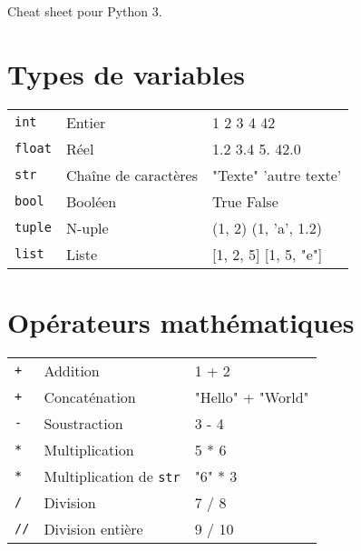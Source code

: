 \documentclass[10pt,a4paper,landscape]{article}
\newcommand*\keystroke[1]{%
  \tikz[baseline=(key.base)]
    \node[%
      draw,
      fill=white,
      drop shadow={shadow xshift=0.25ex,shadow yshift=-0.25ex,fill=black,opacity=0.75},
      rectangle,
      rounded corners=2pt,
      inner sep=1pt,
      line width=0.5pt,
      font=\scriptsize\sffamily
    ](key) {~#1~\strut}
  ;
}
\renewcommand{\familydefault}{\sfdefault}
\begin{document}

\newcommand{\ret}{\keystroke{$\hookleftarrow$}}
\newcommand{\shift}{\keystroke{$\Uparrow~$}}
\newcommand{\alt}{\keystroke{Alt}}
\newcommand{\up}{\keystroke{$\uparrow$}}
\newcommand{\down}{\keystroke{$\downarrow$}}
\newcommand{\bkspc}{\keystroke{$\longmapsfrom$}}
\newcommand{\ctrl}[1]{\texttt{\keystroke{Ctrl}#1}}
\newcommand{\codeintext}[1]{\texttt{#1}}
\raggedright



\begin{multicols}{2}

\begin{LARGE}

Cheat sheet pour Python 3.
\end{LARGE}


\section{Types de variables}
\begin{tabular}{p{3cm}p{4cm}p{\linewidth - 8.25cm}}
\codeintext{int} & Entier & 1 2 3 4 42 \\
\codeintext{float} & R\'eel & 1.2 3.4 5. 42.0 \\
\codeintext{str} & Cha\^ine de caract\`eres & "Texte" 'autre texte'\\
\codeintext{bool} & Bool\'een & True False \\
\codeintext{tuple} & N-uple & (1, 2) (1, 'a', 1.2)\\
\codeintext{list} & Liste & [1, 2, 5] [1, 5, "e"]\\
\end{tabular}

\section{Op\'erateurs math\'ematiques}
\begin{tabular}{p{3cm}p{4cm}p{\linewidth - 8.25cm}}
\codeintext{+} & Addition & 1 + 2\\
\codeintext{+} & Concat\'enation & "Hello" + "World"\\
\codeintext{-} & Soustraction & 3 - 4\\
\codeintext{*} & Multiplication & 5 * 6\\
\codeintext{*} & Multiplication de \codeintext{str} & "6" * 3\\
\codeintext{/} & Division & 7 / 8\\
\codeintext{//} & Division enti\`ere & 9 / 10\\
\end{tabular}


\end{multicols}
\end{document}
